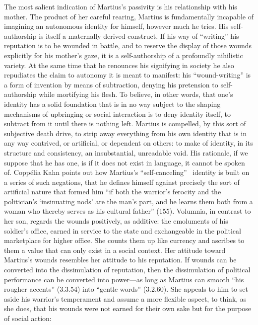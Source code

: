 The most salient indication of Martius's passivity is his relationship with his mother.
The product of her careful rearing, Martius is fundamentally incapable of imagining an autonomous identity for himself, however much he tries.
His self-authorship is itself a maternally derived construct.
If his way of ``writing'' his reputation is to be wounded in battle, and to reserve the display of those wounds explicitly for his mother's gaze, it is a self-authorship of a profoundly nihilistic variety.
At the same time that he renounces his signifying in society he also repudiates the claim to autonomy it is meant to manifest: his ``wound-writing'' is a form of invention by means of subtraction, denying his pretension to self-authorship while mortifying his flesh.
To believe, in other words, that one's identity has a solid foundation that is in no way subject to the shaping mechanisms of upbringing or social interaction is to deny identity itself, to subtract from it until there is nothing left.
Martius is compelled, by this sort of subjective death drive, to strip away everything from his own identity that is in any way contrived, or artificial, or dependent on others: to make of identity, in its structure and consistency, an insubstantial, unreadable void.
His rationale, if we suppose that he has one, is if it does not exist in language, it cannot be spoken of.
Coppélia Kahn points out how Martius's ``self-canceling''~\cite[152]{kahn_roman_1997} identity is built on a series of such negations, that he defines himself against precisely the sort of artificial nature that formed him ``if both the warrior's ferocity and the politician's `insinuating nods' are the man's part, and he learns them both from a woman who thereby serves as his cultural father'' (155).
Volumnia, in contrast to her son, regards the wounds positively, as additive: the emoluments of his soldier's office, earned in service to the state and exchangeable in the political marketplace for higher office.
She counts them up like currency and ascribes to them a value that can only exist in a social context.
Her attitude toward Martius's wounds resembles her attitude to his reputation.
If wounds can be converted into the dissimulation of reputation, then the dissimulation of political performance can be converted into power---as long as Martius can smooth ``his rougher accents'' (3.3.54) into ``gentle words'' (3.2.60).
She appeals to him to set aside his warrior's temperament and assume a more flexible aspect, to think, as she does, that his wounds were not earned for their own sake but for the purpose of social action:
